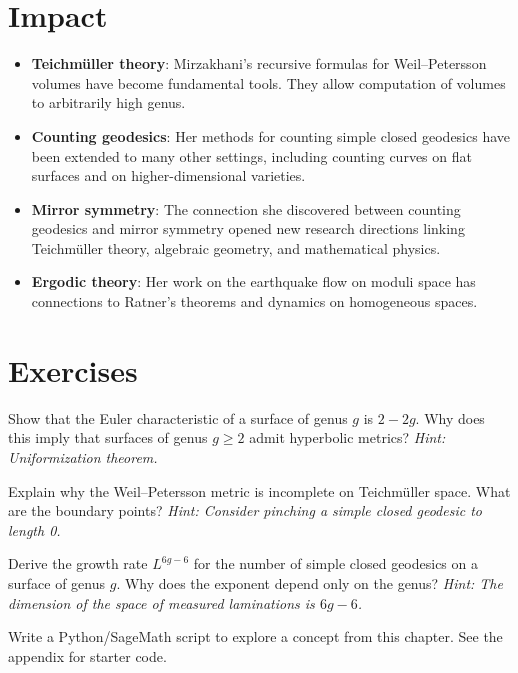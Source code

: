 \section{Impact}

\begin{itemize}
\item \textbf{Teichm\"uller theory}: Mirzakhani's recursive formulas for Weil--Petersson volumes have become fundamental tools. They allow computation of volumes to arbitrarily high genus.
\item \textbf{Counting geodesics}: Her methods for counting simple closed geodesics have been extended to many other settings, including counting curves on flat surfaces and on higher-dimensional varieties.
\item \textbf{Mirror symmetry}: The connection she discovered between counting geodesics and mirror symmetry opened new research directions linking Teichm\"uller theory, algebraic geometry, and mathematical physics.
\item \textbf{Ergodic theory}: Her work on the earthquake flow on moduli space has connections to Ratner's theorems and dynamics on homogeneous spaces.
\end{itemize}

\section{Exercises}

\begin{exercise}[Basic]
Show that the Euler characteristic of a surface of genus $g$ is $2 - 2g$. Why does this imply that surfaces of genus $g \geq 2$ admit hyperbolic metrics? \emph{Hint: Uniformization theorem.}
\end{exercise}

\begin{exercise}[Intermediate]
Explain why the Weil--Petersson metric is incomplete on Teichm\"uller space. What are the boundary points? \emph{Hint: Consider pinching a simple closed geodesic to length 0.}
\end{exercise}

\begin{exercise}[Challenge]
Derive the growth rate $L^{6g-6}$ for the number of simple closed geodesics on a surface of genus $g$. Why does the exponent depend only on the genus? \emph{Hint: The dimension of the space of measured laminations is $6g-6$.}
\end{exercise}


\begin{exercise}[Computational]
Write a Python/SageMath script to explore a concept from this chapter. See the appendix for starter code.
\end{exercise}


